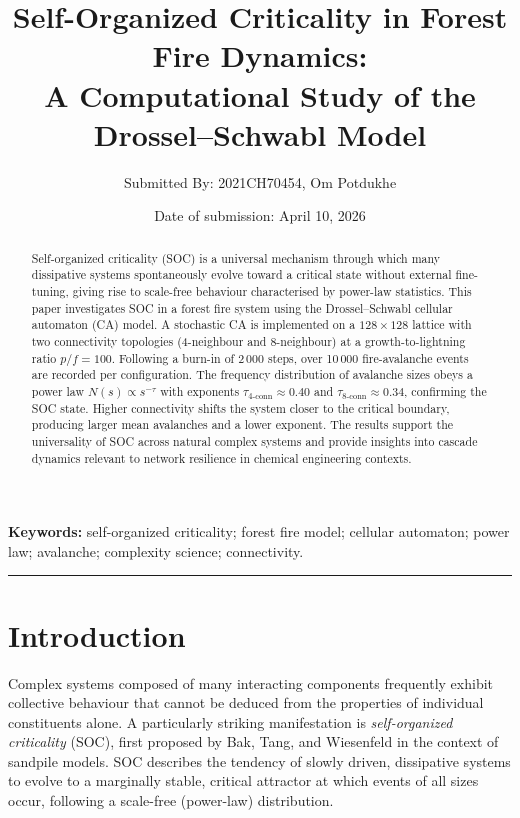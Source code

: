 \documentclass[12pt,a4paper]{article}
\title{\Large\textbf{Self-Organized Criticality in Forest Fire Dynamics:\\
A Computational Study of the Drossel--Schwabl Model}}
\author{Submitted By: 2021CH70454, Om Potdukhe}
\date{Date of submission: April 10, 2026}
\begin{document}
\maketitle

\begin{abstract}
\noindent
Self-organized criticality (SOC) is a universal mechanism through which many
dissipative systems spontaneously evolve toward a critical state without
external fine-tuning, giving rise to scale-free behaviour characterised by
power-law statistics. This paper investigates SOC in a forest fire system
using the Drossel--Schwabl cellular automaton (CA) model. A stochastic CA is
implemented on a $128\times128$ lattice with two connectivity topologies
(4-neighbour and 8-neighbour) at a growth-to-lightning ratio $p/f = 100$.
Following a burn-in of 2\,000 steps, over 10\,000 fire-avalanche events are
recorded per configuration. The frequency distribution of avalanche sizes
obeys a power law $N(s)\propto s^{-\tau}$ with exponents
$\tau_{4\text{-conn}} \approx 0.40$ and $\tau_{8\text{-conn}} \approx 0.34$,
confirming the SOC state. Higher connectivity shifts the system closer to the
critical boundary, producing larger mean avalanches and a lower exponent.
The results support the universality of SOC across natural complex systems
and provide insights into cascade dynamics relevant to network resilience
in chemical engineering contexts.
\end{abstract}

\noindent\textbf{Keywords:} self-organized criticality; forest fire model;
cellular automaton; power law; avalanche; complexity science; connectivity.

\bigskip\hrule\bigskip

\section{Introduction}
\label{sec:intro}

Complex systems composed of many interacting components frequently exhibit
collective behaviour that cannot be deduced from the properties of individual
constituents alone. A particularly striking manifestation is
\emph{self-organized criticality} (SOC), first proposed by Bak, Tang, and
Wiesenfeld \cite{bak1987} in the context of sandpile models. SOC describes
the tendency of slowly driven, dissipative systems to evolve to a marginally
stable, critical attractor at which events of all sizes occur, following a
scale-free (power-law) distribution.
\end{document}
